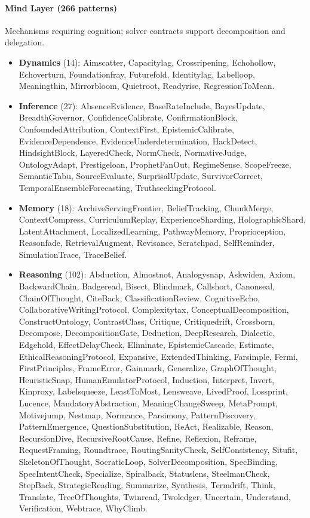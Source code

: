 \paragraph{Mind Layer (266 patterns)} Mechanisms requiring cognition; solver contracts support decomposition and delegation.
\begin{itemize}
    \item \textbf{Dynamics} (14): Aimscatter, Capacitylag, Crossripening, Echohollow, Echoverturn, Foundationfray, Futurefold, Identitylag, Labelloop, Meaningthin, Mirrorbloom, Quietroot, Readyrise, RegressionToMean.
    \item \textbf{Inference} (27): AbsenceEvidence, BaseRateInclude, BayesUpdate, BreadthGovernor, ConfidenceCalibrate, ConfirmationBlock, ConfoundedAttribution, ContextFirst, EpistemicCalibrate, EvidenceDependence, EvidenceUnderdetermination, HackDetect, HindsightBlock, LayeredCheck, NormCheck, NormativeJudge, OntologyAdapt, Prestigeloan, ProphetFanOut, RegimeSense, ScopeFreeze, SemanticTabu, SourceEvaluate, SurprisalUpdate, SurvivorCorrect, TemporalEnsembleForecasting, TruthseekingProtocol.
    \item \textbf{Memory} (18): ArchiveServingFrontier, BeliefTracking, ChunkMerge, ContextCompress, CurriculumReplay, ExperienceSharding, HolographicShard, LatentAttachment, LocalizedLearning, PathwayMemory, Proprioception, Reasonfade, RetrievalAugment, Revisance, Scratchpad, SelfReminder, SimulationTrace, TraceBelief.
    \item \textbf{Reasoning} (102): Abduction, Almostnot, Analogysnap, Askwiden, Axiom, BackwardChain, Badgeread, Bisect, Blindmark, Callshort, Canonseal, ChainOfThought, CiteBack, ClassificationReview, CognitiveEcho, CollaborativeWritingProtocol, Complexitytax, ConceptualDecomposition, ConstructOntology, ContrastClass, Critique, Critiquedrift, Crossborn, Decompose, DecompositionGate, Deduction, DeepResearch, Dialectic, Edgehold, EffectDelayCheck, Eliminate, EpistemicCascade, Estimate, EthicalReasoningProtocol, Expansive, ExtendedThinking, Farsimple, Fermi, FirstPrinciples, FrameError, Gainmark, Generalize, GraphOfThought, HeuristicSnap, HumanEmulatorProtocol, Induction, Interpret, Invert, Kinproxy, Labelsqueeze, LeastToMost, Lensweave, LivedProof, Lossprint, Lucence, MandatoryAbstraction, MeaningChangeSweep, MetaPrompt, Motivejump, Nestmap, Normance, Parsimony, PatternDiscovery, PatternEmergence, QuestionSubstitution, ReAct, Realizable, Reason, RecursionDive, RecursiveRootCause, Refine, Reflexion, Reframe, RequestFraming, Roundtrace, RoutingSanityCheck, SelfConsistency, Situfit, SkeletonOfThought, SocraticLoop, SolverDecomposition, SpecBinding, SpecIntentCheck, Specialize, Spiralback, Statuslens, SteelmanCheck, StepBack, StrategicReading, Summarize, Synthesis, Termdrift, Think, Translate, TreeOfThoughts, Twinread, Twoledger, Uncertain, Understand, Verification, Webtrace, WhyClimb.

\end{itemize}
